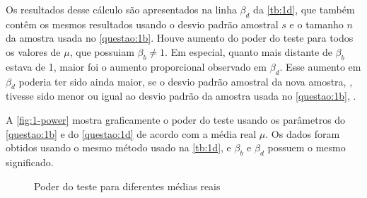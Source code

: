 
Os resultados desse cálculo são apresentados na linha $\beta_d$ da \autoref{tb:1d}, que também contêm os mesmos resultados usando o desvio padrão amostral $s$ e o tamanho $n$ da amostra usada no \autoref{questao:1b}. Houve aumento do poder do teste para todos os valores de $\mu$, que possuiam $\beta_b \neq 1$. Em especial, quanto mais distante de $\beta_b$ estava de 1, maior foi o aumento proporcional observado em $\beta_d$. Esse aumento em $\beta_d$ poderia ter sido ainda maior, se o desvio padrão amostral da nova amostra, \UMDs, tivesse sido menor ou igual ao desvio padrão da amostra usada no \autoref{questao:1b}, \UMAs.



A \autoref{fig:1-power} mostra graficamente o poder do teste usando os parâmetros do \autoref{questao:1b} e do \autoref{questao:1d} de acordo com a média real $\mu$. Os dados foram obtidos usando o mesmo método usado na \autoref{tb:1d}, e $\beta_b$ e $\beta_d$ possuem o mesmo significado.

\begin{figure}[ht]
  \centering
  
  \caption{Poder do teste para diferentes médias reais}
  \label{fig:1-power}
\end{figure}

